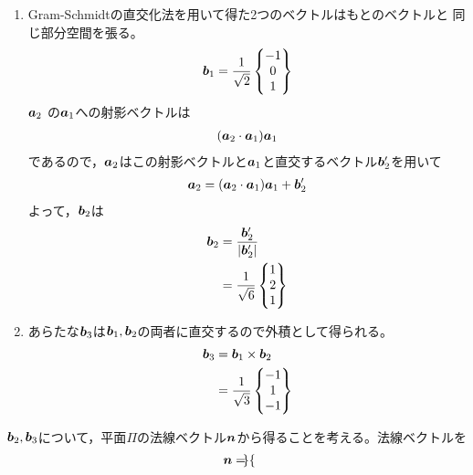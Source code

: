 \begin{ans*}
  ${}$
  \begin{enumerate}[label=(\arabic*)]
    \item Gram-Schmidtの直交化法を用いて得た2つのベクトルはもとのベクトルと
    同じ部分空間を張る。
    \begin{gather}
      {\bm{b}}_1 = \frac{1}{\sqrt{2}}
      \begin{Bmatrix}
      -1 \\ 0 \\ 1
      \end{Bmatrix}
    \end{gather}
    ${\bm{a}}_2$ の${\bm{a}}_1$への射影ベクトルは
    \begin{gather}
      ({\bm{a}}_2\cdot{\bm{a}}_1){\bm{a}}_1
    \end{gather}
    であるので，${\bm{a}}_2$はこの射影ベクトルと${\bm{a}}_1$と直交するベクトル${\bm{b}}'_2$を用いて
    \begin{gather}
      {\bm{a}}_2 = ({\bm{a}}_2\cdot{\bm{a}}_1){\bm{a}}_1 + {\bm{b}}'_2
    \end{gather}
    よって，${\bm{b}}_2$は
    \begin{align}
      {\bm{b}}_2 
      &=
      \frac{{\bm{b}}'_2}{|{\bm{b}}'_2|} \\
      &=
      \frac{1}{\sqrt{6}}
      \begin{Bmatrix}
        1 \\ 2 \\ 1
      \end{Bmatrix}
    \end{align}
    \item あらたな${\bm{b}}_3$は${\bm{b}}_1,{\bm{b}}_2$の両者に直交するので外積として得られる。
    \begin{align}
      {\bm{b}}_3
      &=
      {\bm{b}}_1 \times {\bm{b}}_2 \\
      &=
      \frac{1}{\sqrt{3}}
      \begin{Bmatrix}
        -1 \\ 1 \\ -1
      \end{Bmatrix}
    \end{align}
  \end{enumerate}
  \begin{other*}
    ${\bm{b}}_2,{\bm{b}}_3$について，平面$\Pi$の法線ベクトル${\bm{n}}$から得ることを考える。法線ベクトルを
    \begin{gather}
      {\bm{n}} =
      \begin{Bmatrix}

\end{Bmatrix}
\end{gather}
\end{other*}
\end{ans*}
